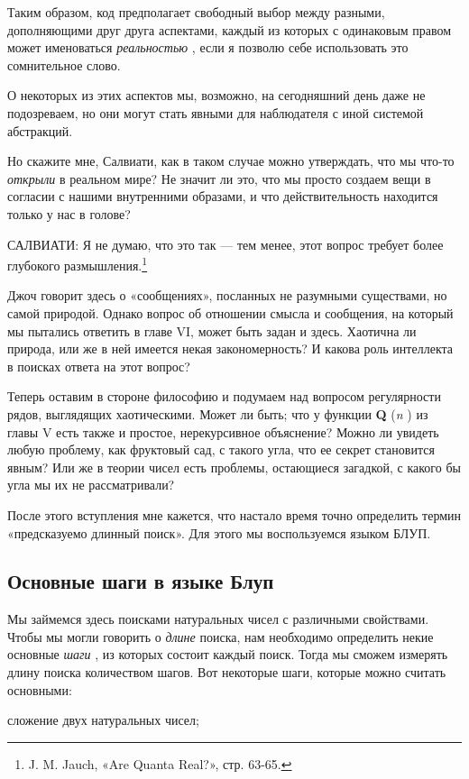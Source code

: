 \documentclass[../main.tex]{subfiles}
\begin{document}
Таким образом, код предполагает свободный выбор между разными, дополняющими друг друга аспектами, каждый из которых с одинаковым правом может именоваться \emph{реальностью} , если я позволю себе использовать это сомнительное слово.

О некоторых из этих аспектов мы, возможно, на сегодняшний день даже не подозреваем, но они могут стать явными для наблюдателя с иной системой абстракций.

Но скажите мне, Салвиати, как в таком случае можно утверждать, что мы что-то \emph{открыли} в реальном мире? Не значит ли это, что мы просто создаем вещи в согласии с нашими внутренними образами, и что действительность находится только у нас в голове?

САЛВИАТИ: Я не думаю, что это так --- тем менее, этот вопрос требует более глубокого размышления.\footnote{J. M. Jauch, «Are Quanta Real?», стр. 63-65.}

Джоч говорит здесь о «сообщениях», посланных не разумными существами, но самой природой. Однако вопрос об отношении смысла и сообщения, на который мы пытались ответить в главе VI, может быть задан и здесь. Хаотична ли природа, или же в ней имеется некая закономерность? И какова роль интеллекта в поисках ответа на этот вопрос?

Теперь оставим в стороне философию и подумаем над вопросом регулярности рядов, выглядящих хаотическими. Может ли быть; что у функции \textbf{Q} (\emph{n} ) из главы V есть также и простое, нерекурсивное объяснение? Можно ли увидеть любую проблему, как фруктовый сад, с такого угла, что ее секрет становится явным? Или же в теории чисел есть проблемы, остающиеся загадкой, с какого бы угла мы их не рассматривали?

После этого вступления мне кажется, что настало время точно определить термин «предсказуемо длинный поиск». Для этого мы воспользуемся языком БЛУП.


\subsection{Основные шаги в языке Блуп}

Мы займемся здесь поисками натуральных чисел с различными свойствами. Чтобы мы могли говорить о \emph{длине} поиска, нам необходимо определить некие основные \emph{шаги} , из которых состоит каждый поиск. Тогда мы сможем измерять длину поиска количеством шагов. Вот некоторые шаги, которые можно считать основными:

сложение двух натуральных чисел;
\end{document}
